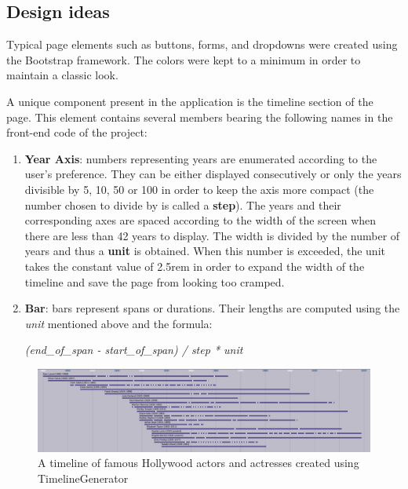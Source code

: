 \documentclass{report}
\begin{document}
\subsection {Design ideas}
Typical page elements such as buttons, forms, and dropdowns were created using the Bootstrap framework. The colors were kept to a minimum in order to maintain a classic look. \par
A unique component present in the application is the timeline section of the page. This element contains several members bearing the following names in the front-end code of the project:
\begin{enumerate}
  \item \textbf{Year Axis}: numbers representing years are enumerated according to the user's preference. They can be either displayed consecutively or only the years divisible by 5, 10, 50 or 100 in order to keep the axis more compact (the number chosen to divide by is called a \textbf{step}). The years and their corresponding axes are spaced according to the width of the screen when there are less than 42 years to display. The width is divided by the number of years and thus a \textbf{unit} is obtained. When this number is exceeded, the unit takes the constant value of 2.5rem in order to expand the width of the timeline and save the page from looking too cramped. 
  \item \textbf{Bar}: bars represent spans or durations. Their lengths are computed using the \textit{unit} mentioned above and the formula:\\\centerline{\textit{(end\_of\_span - start\_of\_span) / step * unit}}
\end{enumerate}

\begin{figure}[h]
\vspace*{3cm}
\centerline{\includegraphics[scale=0.45]{tl}}
\caption{A timeline of famous Hollywood actors and actresses created using TimelineGenerator}
\end{figure}
\newpage
\end{document}
